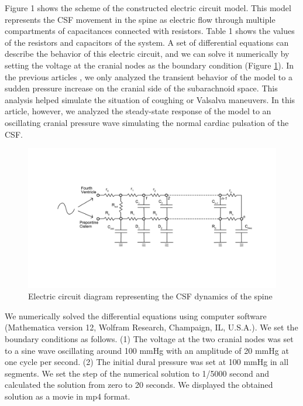 \documentclass[fleqn,10pt]{wlscirep}
\begin{document}
Figure 1 shows the scheme of the constructed electric circuit model. This
model represents the CSF movement in the spine as electric flow through
multiple compartments of capacitances connected with resistors. Table 1
shows the values of the resistors and capacitors of the system.  A set of
differential equations can describe the behavior of this electric circuit,
and we can solve it numerically by setting the voltage at the cranial nodes
as the boundary condition (Figure \ref{fig:circuit}). In the previous articles
\cite{chang2003hypothesis, chang2004theoretical}, we only analyzed the
transient behavior of the model to a sudden pressure increase on the
cranial side of the subarachnoid space. This analysis helped simulate the
situation of coughing or Valsalva maneuvers. In this article, however, we
analyzed the steady-state response of the model to an oscillating cranial
pressure wave simulating the normal cardiac pulsation of the CSF.

\begin{figure}[ht]
    \centering
    \includegraphics[width=\textwidth]{electric_circuit_new.jpg}
    \caption{Electric circuit diagram representing the CSF dynamics of the spine}
    \label{fig:circuit}
\end{figure}

We numerically solved the differential equations using computer software
(Mathematica version 12, Wolfram Research, Champaign, IL, U.S.A.). We set
the boundary conditions as follows. (1) The voltage at the two cranial
nodes was set to a sine wave oscillating around 100 mmHg with an amplitude
of 20 mmHg at one cycle per second. (2) The initial dural pressure was set
at 100 mmHg in all segments. We set the step of the numerical solution to
1/5000 second and calculated the solution from zero to 20 seconds. We
displayed the obtained solution as a movie in mp4 format.
\end{document}
